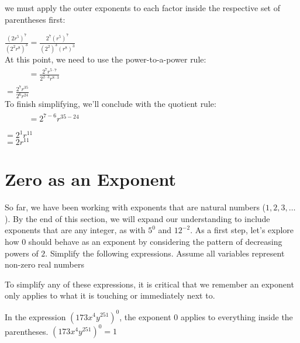 \documentclass{ximera}
\begin{document}
\begin{example}
\begin{explanation}
\begin{enumerate}
                  we must apply the outer exponents to each factor inside the respective set of parentheses first:
              \begin{center}
                    $\frac{\left(2r^5\right)^7}{\left(2^2 r^8\right)^3}
                    =  \frac{2^7 \left(r^5\right)^7}{\left(2^2\right)^3 \left(r^8\right)^3}$\\
                   At this point, we need to use the power-to-a-power rule:\\
                    $\phantom{\frac{\left(2r^5\right)^7}{\left(2^2 r^8\right)^3}}
                    = \frac{2^{7} r^{5\cdot 7}}{ 2^{2\cdot 3} r^{8 \cdot 3}}$\\
                    $= \frac{2^{7} r^{35}}{ 2^{6} r^{24}}$\\
                   To finish simplifying, we'll conclude with the quotient rule:\\
                    $\phantom{\frac{\left(2r^5\right)^7}{\left(2^2 r^8\right)^3}}
                    = 2^{7-6} r^{35-24}$\\
                    $= 2^{1} r^{11}$\\
                    $= 2 r^{11}$
\end{center}
\end{enumerate}
\end{explanation}
\end{example}
\section{Zero as an Exponent}
So far, we have been working with exponents that are natural numbers
      ($1, 2, 3, \ldots$).
      By the end of this section,
      we will expand our understanding to include exponents that are any integer,
      as with $5^{0}$ and $12^{-2}$.
      As a first step,
      let's explore how $0$ should behave as an exponent
      by considering the pattern of decreasing powers of $2$.    
 Simplify the following expressions.
              Assume all variables represent non-zero real numbers


To simplify any of these expressions,
              it is critical that we remember an exponent only applies to what it is touching or immediately next to.


     In the expression $\left(173 x^4 y^{251}\right)^0$,
                    the exponent $0$ applies to everything inside the parentheses.
$
                      \left(173 x^4 y^{251}\right)^0 =  1
                    $
\end{document}
